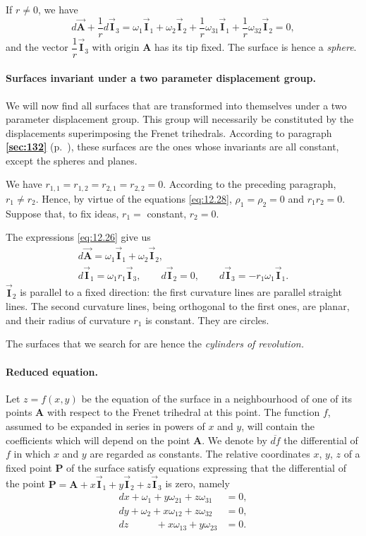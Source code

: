 \documentclass[leqno,11pt]{book}
\numberwithin{equation}{chapter}
\theoremstyle{shape1}
\theoremstyle{shapesmall}
\newcommand{\fsref}[1]{{\rm\textsection\textbf{\ref{sec:#1}}}}
\newcommand{\rvec}[1]{\vec{\mathbf{#1}}}
\newcommand{\ivec}{\rvec{I}}
\begin{document}
If $r\neq 0$, we have
\[
d\vec{\mathbf{A}}+\frac{1}{r}d\ivec_{3}=\omega_{1}\ivec_{1}+\omega_{2}\ivec_{2}+\frac{1}{r}\omega_{31}\ivec_{1}+\frac{1}{r}\omega_{32}\ivec_{2}=0,
\]
and the vector $\dfrac{1}{r}\ivec_{3}$ with origin $\mathbf{A}$ has its tip fixed. The surface is hence a \emph{sphere}.

\paragraph{Surfaces invariant under a two parameter displacement group.}
\label{sec:193}
We will now find all surfaces that are transformed into themselves under a two parameter displacement group. This group will necessarily be constituted by the displacements superimposing the Frenet trihedrals. According to paragraph \fsref{132} (p.~\pageref{sec:132}), these surfaces are the ones whose invariants are all constant, except the spheres and planes.

We have $r_{1,1}=r_{1,2}=r_{2,1}=r_{2,2}=0$. According to the preceding paragraph, $r_{1}\neq r_{2}$. Hence, by virtue of the equations \eqref{eq:12.28}, $\rho_{1}=\rho_{2}=0$ and $r_{1}r_{2}=0$. Suppose that, to fix ideas, $r_{1}=$ constant, $r_{2}=0$.

The expressions \eqref{eq:12.26} give us
\begin{gather*}
  d\vec{\mathbf{A}}=\omega_{1}\ivec_{1}+\omega_{2}\ivec_{2},\\
  d\ivec_{1}=\omega_{1}r_{1}\ivec_{3},\qquad d\ivec_{2}=0,\qquad d\ivec_{3}=-r_{1}\omega_{1}\ivec_{1}.
\end{gather*}
$\ivec_{2}$ is parallel to a fixed direction: the first curvature lines are parallel straight lines. The second curvature lines, being orthogonal to the first ones, are planar, and their radius of curvature $r_{1}$ is constant. They are circles.

The surfaces that we search for are hence the \emph{cylinders of revolution.}



\paragraph{Reduced equation.}
\label{sec:194}
Let $z=f(x,y)$ be the equation of the surface in a neighbourhood of one of its points $\mathbf{A}$ with respect to the Frenet trihedral at this point. The function $f$, assumed to be expanded in series in powers of $x$ and $y$, will contain the coefficients which will depend on the point $\mathbf{A}$. We denote by $\overline{df}$ the differential of $f$ in which $x$ and $y$ are regarded as constants. The relative coordinates $x$, $y$, $z$ of a fixed point $\mathbf{P}$ of the surface satisfy equations expressing that the differential of the point $\mathbf{P}=\mathbf{A}+x\ivec_{1}+y\ivec_{2}+z\ivec_{3}$ is zero, namely
\begin{align*}
  dx+\omega_{1}+y\omega_{21}+z\omega_{31}&=0,\\
  dy+\omega_{2}+x\omega_{12}+z\omega_{32}&=0,\\
  dz\phantom{\,+\,}\phantom{\,\omega_{3}}+x\omega_{13}+y\omega_{23}&=0.
\end{align*}
\end{document}
